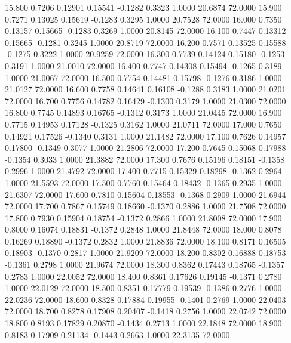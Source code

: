   15.800   0.7206   0.12901   0.15541  -0.1282   0.3323   1.0000  20.6874  72.0000
  15.900   0.7271   0.13025   0.15619  -0.1283   0.3295   1.0000  20.7528  72.0000
  16.000   0.7350   0.13157   0.15665  -0.1283   0.3269   1.0000  20.8145  72.0000
  16.100   0.7447   0.13312   0.15665  -0.1281   0.3245   1.0000  20.8719  72.0000
  16.200   0.7571   0.13525   0.15588  -0.1275   0.3222   1.0000  20.9259  72.0000
  16.300   0.7739   0.14124   0.15180  -0.1253   0.3191   1.0000  21.0010  72.0000
  16.400   0.7747   0.14308   0.15494  -0.1265   0.3189   1.0000  21.0067  72.0000
  16.500   0.7754   0.14481   0.15798  -0.1276   0.3186   1.0000  21.0127  72.0000
  16.600   0.7758   0.14641   0.16108  -0.1288   0.3183   1.0000  21.0201  72.0000
  16.700   0.7756   0.14782   0.16429  -0.1300   0.3179   1.0000  21.0300  72.0000
  16.800   0.7745   0.14893   0.16765  -0.1312   0.3173   1.0000  21.0445  72.0000
  16.900   0.7715   0.14953   0.17128  -0.1325   0.3162   1.0000  21.0711  72.0000
  17.000   0.7650   0.14921   0.17526  -0.1340   0.3131   1.0000  21.1482  72.0000
  17.100   0.7626   0.14957   0.17800  -0.1349   0.3077   1.0000  21.2806  72.0000
  17.200   0.7645   0.15068   0.17988  -0.1354   0.3033   1.0000  21.3882  72.0000
  17.300   0.7676   0.15196   0.18151  -0.1358   0.2996   1.0000  21.4792  72.0000
  17.400   0.7715   0.15329   0.18298  -0.1362   0.2964   1.0000  21.5593  72.0000
  17.500   0.7760   0.15464   0.18432  -0.1365   0.2935   1.0000  21.6307  72.0000
  17.600   0.7810   0.15604   0.18553  -0.1368   0.2909   1.0000  21.6944  72.0000
  17.700   0.7867   0.15749   0.18660  -0.1370   0.2886   1.0000  21.7508  72.0000
  17.800   0.7930   0.15904   0.18754  -0.1372   0.2866   1.0000  21.8008  72.0000
  17.900   0.8000   0.16074   0.18831  -0.1372   0.2848   1.0000  21.8448  72.0000
  18.000   0.8078   0.16269   0.18890  -0.1372   0.2832   1.0000  21.8836  72.0000
  18.100   0.8171   0.16505   0.18903  -0.1370   0.2817   1.0000  21.9209  72.0000
  18.200   0.8302   0.16888   0.18753  -0.1361   0.2798   1.0000  21.9674  72.0000
  18.300   0.8362   0.17443   0.18765  -0.1357   0.2783   1.0000  22.0052  72.0000
  18.400   0.8361   0.17626   0.19145  -0.1371   0.2780   1.0000  22.0129  72.0000
  18.500   0.8351   0.17779   0.19539  -0.1386   0.2776   1.0000  22.0236  72.0000
  18.600   0.8328   0.17884   0.19955  -0.1401   0.2769   1.0000  22.0403  72.0000
  18.700   0.8278   0.17908   0.20407  -0.1418   0.2756   1.0000  22.0742  72.0000
  18.800   0.8193   0.17829   0.20870  -0.1434   0.2713   1.0000  22.1848  72.0000
  18.900   0.8183   0.17909   0.21134  -0.1443   0.2663   1.0000  22.3135  72.0000
